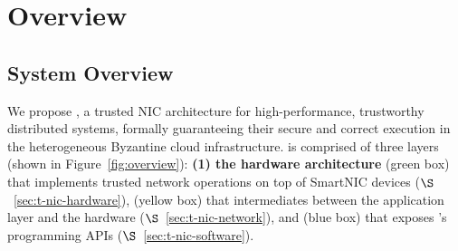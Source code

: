 \section{Overview}

\subsection{System Overview}

We propose \projecttitle{}, a trusted NIC architecture for high-performance, trustworthy distributed systems, formally guaranteeing their secure and correct execution in the heterogeneous Byzantine cloud infrastructure. 
\projecttitle{} is comprised of three layers (shown in Figure~\ref{fig:overview}): {\bf (1)  the \projecttitle{} hardware architecture} (green box) that implements trusted network operations on top of SmartNIC devices ($\S$~\ref{sec:t-nic-hardware}),  (yellow box) that intermediates between the application layer and the \projecttitle{} hardware ($\S$~\ref{sec:t-nic-network}), and  (blue box) that exposes \projecttitle{}'s programming APIs ($\S$~\ref{sec:t-nic-software}). 

